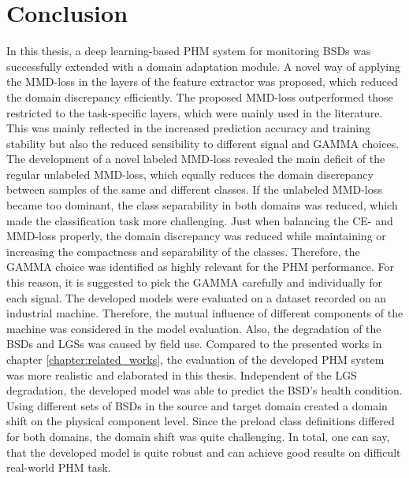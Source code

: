 \chapter{Conclusion}\label{chapter:conclusion}

In this thesis, a deep learning-based PHM system for monitoring BSDs was successfully extended with a domain adaptation module. A novel way of applying the MMD-loss in the layers of the feature extractor was proposed, which reduced the domain discrepancy efficiently. The proposed MMD-loss outperformed those restricted to the task-specific layers, which were mainly used in the literature. This was mainly reflected in the increased prediction accuracy and training stability but also the reduced sensibility to different signal and GAMMA choices. The development of a novel labeled MMD-loss revealed the main deficit of the regular unlabeled MMD-loss, which equally reduces the domain discrepancy between samples of the same and different classes. If the unlabeled MMD-loss became too dominant, the class separability in both domains was reduced, which made the classification task more challenging. Just when balancing the CE- and MMD-loss properly, the domain discrepancy was reduced while maintaining or increasing the compactness and separability of the classes. Therefore, the GAMMA choice was identified as highly relevant for the PHM performance. For this reason, it is suggested to pick the GAMMA carefully and individually for each signal. The developed models were evaluated on a dataset recorded on an industrial machine. Therefore, the mutual influence of different components of the machine was considered in the model evaluation. Also, the degradation of the BSDs and LGSs was caused by field use. Compared to the presented works in chapter \ref{chapter:related_works}, the evaluation of the developed PHM system was more realistic and elaborated in this thesis. Independent of the LGS degradation, the developed model was able to predict the BSD's health condition. Using different sets of BSDs in the source and target domain created a domain shift on the physical component level. Since the preload class definitions differed for both domains, the domain shift was quite challenging. In total, one can say, that the developed model is quite robust and can achieve good results on difficult real-world PHM task.